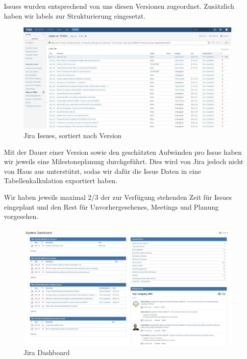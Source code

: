 		Issues wurden entsprechend von uns diesen Versionen zugeordnet.
		Zusätzlich haben wir labels zur Strukturierung eingesetzt.
		
		\begin{figure}[H]
			\includegraphics[width=\textwidth]{projectPlan/media/img/jiraIssuesOpenOrTodo.jpg}
			\centering
			\caption{Jira Issues, sortiert nach Version}
			\label{fig:jiraIssuesOpenOrTodo}
		\end{figure}
		
		Mit der Dauer einer Version sowie den geschätzten Aufwänden
		pro Issue haben wir jeweils eine Milestoneplanung durchgeführt.
		Dies wird von Jira jedoch nicht von Haus aus unterstützt,
		sodas wir dafür die Issue Daten in eine Tabellenkalkulation exportiert haben.
		
		Wir haben jeweils maximal 2/3 der zur Verfügung stehenden Zeit für
		Issues eingeplant und den Rest für Unvorhergesehenes, 
		Meetings und Planung vorgesehen.
		
		\begin{figure}[H]
			\includegraphics[width=\textwidth]{projectPlan/media/img/jiraDashBoard.jpg}
			\centering
			\caption{Jira Dashboard}
			\label{fig:jiraDashBoard}
		\end{figure}
		
